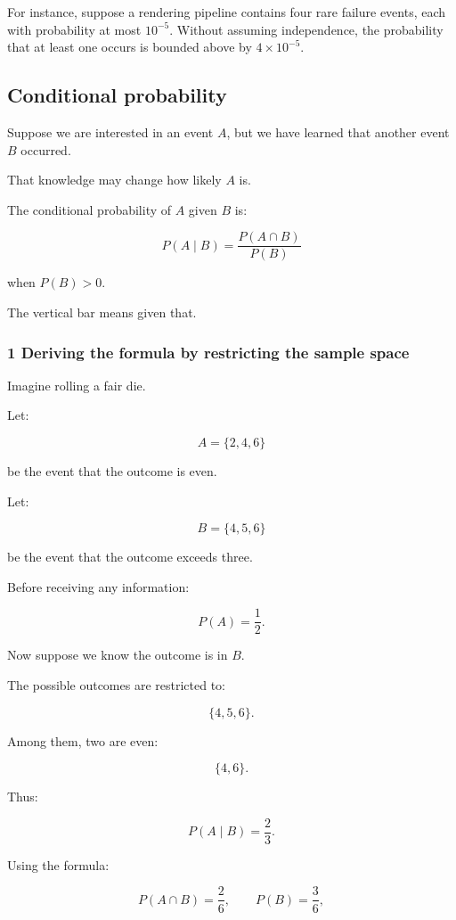 For instance, suppose a rendering pipeline contains four rare failure events, each with probability at most \(10^{-5}\). Without assuming independence, the probability that at least one occurs is bounded above by \(4\times10^{-5}\).

\subsection{Conditional probability}\label{02-foundations-ii-ch023-conditional-probability}

Suppose we are interested in an event \(A\), but we have learned that another event \(B\) occurred.

That knowledge may change how likely \(A\) is.

The conditional probability of \(A\) given \(B\) is:

\[
 \boxed{ P(A\mid B) = \frac{P(A\cap B)}{P(B)} }
\]

when \(P(B)>0\).

The vertical bar means given that.

\subsubsection{1 Deriving the formula by restricting the sample space}\label{02-foundations-ii-ch023-deriving-the-formula-by-restricting-the-sample-space}

Imagine rolling a fair die.

Let:

\[
 A=\{2,4,6\}
\]

be the event that the outcome is even.

Let:

\[
 B=\{4,5,6\}
\]

be the event that the outcome exceeds three.

Before receiving any information:

\[
 P(A)=\frac12.
\]

Now suppose we know the outcome is in \(B\).

The possible outcomes are restricted to:

\[
 \{4,5,6\}.
\]

Among them, two are even:

\[
 \{4,6\}.
\]

Thus:

\[
 P(A\mid B)=\frac23.
\]

Using the formula:

\[
 P(A\cap B)=\frac26, \qquad P(B)=\frac36,
\]

